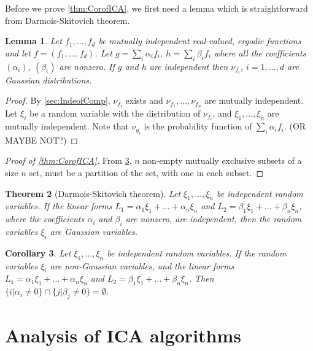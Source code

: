 \documentclass[english]{article} %
\newtheorem{lemma}{Lemma}[section]
\newtheorem{thm}[lemma]{Theorem}
\newtheorem{cor}[lemma]{Corollary}
\theoremstyle{definition}
\begin{document}
Before we prove \cref{thm:CorofICA}, we first need a lemma which is straightforward from Darmois-Skitovich theorem.
\begin{lemma}
Let $f_1,\ldots,f_d$ be mutually independent real-valued, ergodic functions and let $f = (f_1,\ldots,f_d)$.
Let $g = \sum_i \alpha_i f_i$, $h = \sum_i \beta_i f_i$ where all the coefficients $(\alpha_i)$, $(\beta_i)$ are nonzero.
If $g$ and $h$ are independent then $\nu_{f_i}$, $i=1,\ldots,d$ are Gaussian distributions.
\end{lemma}
\begin{proof}
By \cref{sec:IndeofComp}, $\nu_{f_i}$ exists and $\nu_{f_1},\ldots,\nu_{f_n}$ are mutually independent. 
Let $\xi_i$ be a random variable with the distribution of $\nu_{f_i}$, and  $\xi_1,\ldots,\xi_n$ are mutually independent. Note that $\nu_{g_i}$ is the probability function of $\sum_{i}\alpha_if_i$. (OR MAYBE NOT?) 
\end{proof}

\begin{proof}[Proof of \cref{thm:CorofICA}]
From \cref{cor:DSTheoremCor}. $n$ non-empty mutually exclusive subsets of a size $n$ set, must be a partition of the set, with one in each subset.
\end{proof}
\begin{thm}[Darmois-Skitovich theorem]
Let $\xi_1,\ldots,\xi_n$ be independent random variables. If the linear forms $L_1 = \alpha_1\xi_1 + \ldots + \alpha_n\xi_n$ and $L_2 = \beta_1\xi_1 +\ldots + \beta_n\xi_n$, where the coefficients $\alpha_i$ and $\beta_i$ are nonzero, are independent, then the random variables $\xi_i$ are Gaussian variables.
\end{thm}

\begin{cor}
\label{cor:DSTheoremCor}
Let $\xi_1,\ldots,\xi_n$ be independent random variables. If the random variables $\xi_i$ are non-Gaussian variables, and the linear forms $L_1 = \alpha_1\xi_1 + \ldots + \alpha_n\xi_n$ and $L_2 = \beta_1\xi_1 +\ldots + \beta_n\xi_n$.  Then $\{i\vert \alpha_i \neq0\} \cap \{j\vert \beta_j \neq0\} = \emptyset$.
\end{cor}


\section{Analysis of ICA algorithms}
\end{document}
